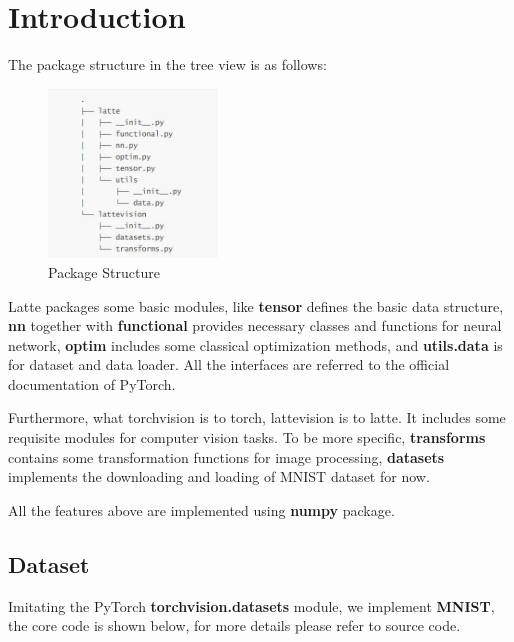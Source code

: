 \documentclass[a4paper, 11pt]{article} %
\begin{document}
\section{\textbf{Introduction}}

The package structure in the tree view is as follows:

\begin{figure}[H]
    \centering
    \includegraphics[width=0.4\textwidth]{./img/tree.jpg}
    \caption{Package Structure}
\end{figure}

Latte packages some basic modules, like \textbf{tensor} defines the basic data structure,
\textbf{nn} together with \textbf{functional} provides necessary classes and functions
for neural network, \textbf{optim} includes some classical optimization methods, and
\textbf{utils.data} is for dataset and data loader. All the interfaces are referred to
the official documentation of PyTorch.

Furthermore, what torchvision is to torch, lattevision is to latte. It includes some
requisite modules for computer vision tasks. To be more specific, \textbf{transforms}
contains some transformation functions for image processing, \textbf{datasets} implements
the downloading and loading of MNIST dataset for now.

All the features above are implemented using \textbf{numpy} package.

\subsection{\textbf{Dataset}}

Imitating the PyTorch \textbf{torchvision.datasets} module, we implement \textbf{MNIST},
the core code is shown below, for more details please refer to source code.
\end{document}
